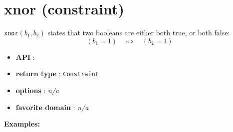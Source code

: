 \label{xnor}
\hypertarget{xnor}{}

\section{xnor (constraint)}\label{xnor:xnorconstraint}\hypertarget{xnor:xnorconstraint}{}
\begin{notedef}
    \texttt{xnor}$(b_1,b_2)$ states that two booleans are either both true, or both false:
$$ (b_1=1)\quad\iff\quad(b_2=1)$$
\end{notedef}

\begin{itemize}
    \item \textbf{API} : 
	\item \textbf{return type} : \texttt{Constraint}
	\item \textbf{options} : \emph{n/a}
	\item \textbf{favorite domain} : \emph{n/a}
\end{itemize}

\textbf{Examples:}

